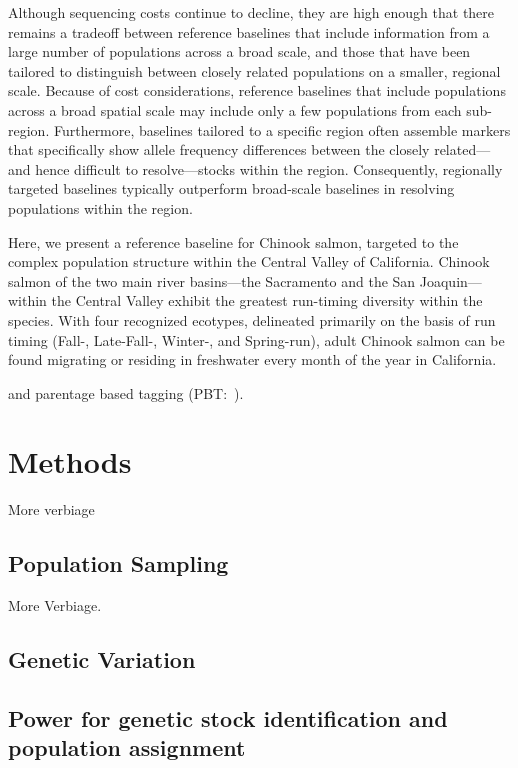 Although sequencing costs continue to decline, they are high enough
that there remains a tradeoff
between reference baselines that include information from a large number of
populations across a broad scale, and those that have been tailored
to distinguish between closely related populations on a smaller, regional scale.
Because of cost considerations, reference baselines that include populations across a broad 
spatial scale may include only a few populations from each sub-region.  Furthermore,
baselines tailored to a specific region often assemble markers that specifically
show allele frequency differences between the closely related---and hence difficult
to resolve---stocks within the region.  Consequently, regionally targeted baselines typically
outperform broad-scale baselines in resolving populations within the region.

Here, we present a reference baseline for Chinook salmon, targeted to the complex population 
structure within the Central Valley of California. Chinook salmon of the two main river basins---the 
Sacramento and the San Joaquin---within the Central Valley exhibit the greatest run-timing diversity
within the species.  With four recognized ecotypes, delineated primarily on the basis of run timing
(Fall-, Late-Fall-, Winter-, and Spring-run), adult Chinook salmon can be found migrating or residing
in freshwater every month of the year in California.  


 and parentage based tagging
(PBT:~\citealt{anderson2006power, garza2007large, abadia2013large, steele2013validation}).  

\section*{Methods}

More verbiage

\subsection*{Population Sampling}

More Verbiage.


\subsection*{Genetic Variation}

\subsection*{Power for genetic stock identification and population assignment}


